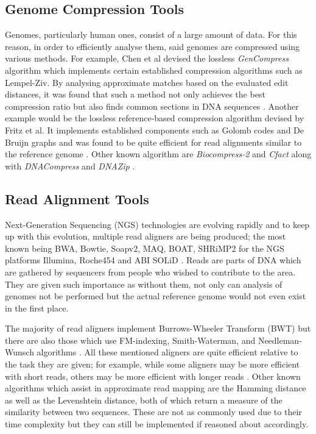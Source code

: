 \documentclass{csfyp}
\begin{document}
\subsection{Genome Compression Tools}
Genomes, particularly human ones, consist of a large amount of data.  For this reason, in order to efficiently analyse them, said genomes are compressed using various methods.  For example, Chen et al devised the lossless {\textit{GenCompress}} algorithm which implements certain established compression algorithms such as Lempel-Ziv.  By analysing approximate matches based on the evaluated edit distances, it was found that such a method not only achieves the best compression ratio but also finds common sections in DNA sequences \cite{gencompress}.  Another example would be the lossless reference-based compression algorithm devised by Fritz et al.  It implements established components such as Golomb codes and De Bruijn graphs and was found to be quite efficient for read alignments similar to the reference genome \cite{refcompression}.  Other known algorithm are {\textit{Biocompress-2}} and {\textit{Cfact}} \cite{gencompress} along with {\textit{DNACompress}} and {\textit{ DNAZip}} \cite{refcompression}.          

\subsection{Read Alignment Tools}
Next-Generation Sequencing (NGS) technologies are evolving rapidly and to keep up with this evolution, multiple read aligners are being produced; the most known being BWA, Bowtie, Soapv2, MAQ, BOAT, SHRiMP2 for the NGS platforms Illumina, Roche454 and ABI SOLiD \cite{bwtransform, popgen, cgreads}.  Reads are parts of DNA which are gathered by sequencers from people who wished to contribute to the area.  They are given such importance as without them, not only can analysis of genomes not be performed but the actual reference genome would not even exist in the first place.   

The majority of read aligners implement Burrows-Wheeler Transform (BWT) but there are also those which use FM-indexing, Smith-Waterman,  and Needleman-Wunsch algorithms \cite{bwtransform, popgen, cgreads}.  All these mentioned aligners are quite efficient relative to the task they are given; for example, while some aligners may be more efficient with short reads, others may be more efficient with longer reads \cite{companalys, compalign}.  Other known algorithms which assist in approximate read mapping are the Hamming distance as well as the Levenshtein distance, both of which return a measure of the similarity between two sequences.  These are not as commonly used due to their time complexity but they can still be implemented if reasoned about accordingly.
\end{document}
